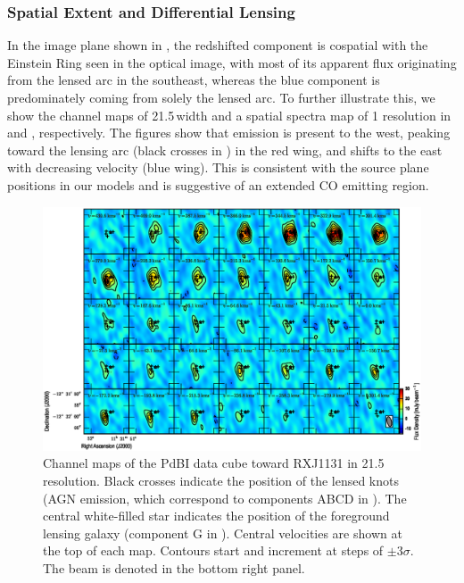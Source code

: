 \documentclass[]{emulateapj}
\begin{document}
\subsubsection{Spatial Extent and Differential Lensing} \label{sec:differential}
In the image plane shown in  , the redshifted component is
cospatial with the Einstein Ring seen in the
optical image, with most of its apparent flux originating from the lensed arc
in the southeast, whereas the blue component is predominately coming from
solely the lensed arc. To further illustrate this, we show the
channel maps of 21.5\,\kms width and a spatial spectra map of 1 resolution in
 and , respectively. The figures
show that emission
is present to the west, peaking toward the lensing arc (black crosses in
) in the red wing, and shifts to the east with decreasing velocity
(blue wing).
This is consistent with the source plane positions in our models and
is suggestive of an extended CO emitting region.

\begin{figure}[!htbp]
\centering
\includegraphics[width=1.0\textwidth]{../Figures/co_channel_maps.eps}
\caption{
Channel maps of the PdBI \bco data cube toward RXJ1131 in 21.5\,\kms resolution.
Black crosses indicate the position of the lensed knots (AGN emission,
which correspond to components ABCD in ). The central white-filled
star indicates the position of the foreground lensing galaxy (component G
in ).
Central velocities are shown at the top of each map.
Contours start and increment at steps of
$\pm$3$\sigma$. The beam is denoted in the bottom right panel. \label{fig:chanmap}}
\end{figure}
\end{document}
